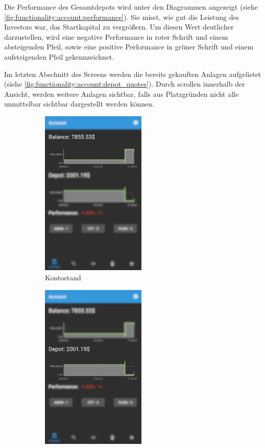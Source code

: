 \documentclass[a4paper]{article}
\begin{document}
Die Performance des Gesamtdepots wird unter den Diagrammen angezeigt (siehe \autoref{fig:functionality:account:performance}). Sie misst, wie gut die Leistung des Investors war, das Startkapital zu vergrößern. Um diesen Wert deutlicher darzustellen, wird eine negative Performance in roter Schrift und einem absteigenden Pfeil, sowie eine positive Performance in grüner Schrift und einem aufsteigenden Pfeil gekennzeichnet.

Im letzten Abschnitt des Screens werden die bereits gekauften Anlagen aufgelistet (siehe \autoref{fig:functionality:account:depot_quotes}). Durch scrollen innerhalb der Ansicht, werden weitere Anlagen sichtbar, falls aus Platzgründen nicht alle unmittelbar sichtbar dargestellt werden können.

\begin{figure}[H]
    \begin{subfigure}{.5\textwidth}
        \centering
        \includegraphics[height=8cm,keepaspectratio]{./images/account/balance.png}
        \caption{Kontostand}
        \label{fig:functionality:account:balance}
    \end{subfigure}
    \begin{subfigure}{.5\textwidth}
        \centering
        \includegraphics[height=8cm,keepaspectratio]{./images/account/depot.png}

\end{subfigure}
\end{figure}
\end{document}
